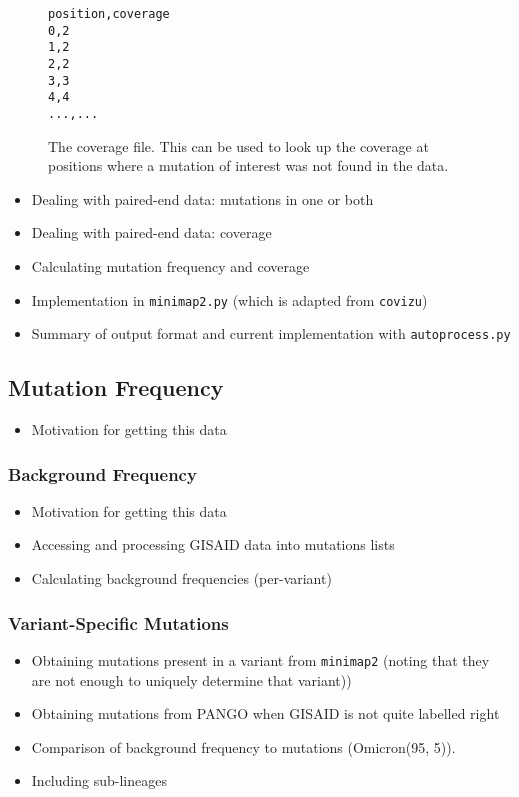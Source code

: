 \documentclass{article}
\newenvironment{tightemize}
{ \begin{itemize}
    \setlength{\itemsep}{0pt}
    \setlength{\parskip}{0pt}
    \setlength{\parsep}{0pt}     }
{ \end{itemize}                  }
\begin{document}
\begin{figure}[h!]
\begin{verbatim}
position,coverage
0,2
1,2
2,2
3,3
4,4
...,...
\end{verbatim}
\caption{The coverage file. This can be used to look up the coverage at positions where a mutation of interest was not found in the data.}
\label{coverage}
\end{figure}

\begin{tightemize}
    \item Dealing with paired-end data: mutations in one or both
    \item Dealing with paired-end data: coverage
    \item Calculating mutation frequency and coverage
    \item Implementation in \texttt{minimap2.py} (which is adapted from \texttt{covizu})
    \item Summary of output format and current implementation with \texttt{autoprocess.py}
\end{tightemize}


\subsection{Mutation Frequency}


\begin{tightemize}
    \item Motivation for getting this data
\end{tightemize}

\subsubsection{Background Frequency}
\begin{tightemize}
    \item Motivation for getting this data
    \item Accessing and processing GISAID data into mutations lists
    \item Calculating background frequencies (per-variant)
\end{tightemize}

\subsubsection{Variant-Specific Mutations}

\begin{tightemize}
    \item Obtaining mutations present in a variant from \texttt{minimap2} (noting that they are not enough to uniquely determine that variant))
    \item Obtaining mutations from PANGO when GISAID is not quite labelled right
    \item Comparison of background frequency to mutations (Omicron(95, 5)). 
    \item Including sub-lineages
\end{tightemize}
\end{document}
